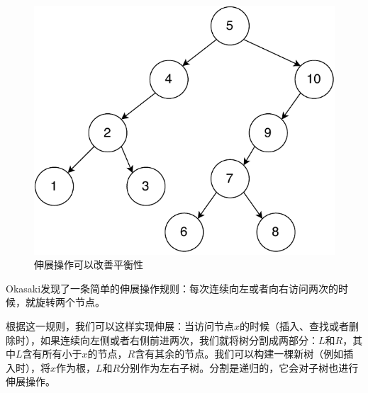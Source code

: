 \documentclass[b5paper]{ctexart}
\begin{document}
\begin{figure}[htbp]
  \centering
  \includegraphics[scale=0.5]{img/splay-tree}
  \caption{伸展操作可以改善平衡性}
  \label{fig:splay-result}
\end{figure}

Okasaki发现了一条简单的伸展操作规则\cite{okasaki-book}：每次连续向左或者向右访问两次的时候，就旋转两个节点。

根据这一规则，我们可以这样实现伸展：当访问节点$x$的时候（插入、查找或者删除时），如果连续向左侧或者右侧前进两次，我们就将树分割成两部分：$L$和$R$，其中$L$含有所有小于$x$的节点，$R$含有其余的节点。我们可以构建一棵新树（例如插入时），将$x$作为根，$L$和$R$分别作为左右子树。分割是递归的，它会对子树也进行伸展操作。
\end{document}
